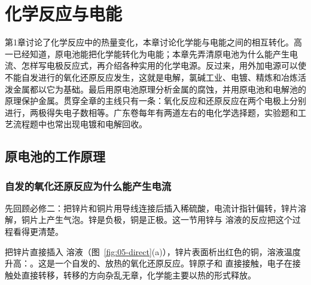\newcommand{\cfivebeaker}[4]{%
  \fill[mainblue!8] (#1,0) rectangle ++(#2,#4);
  \draw[thick] (#1,#3)--(#1,0)--++(#2,0)--++(0,#3);}
\newcommand{\cfivepower}[2]{%
  \draw[thick] (#1-0.12,#2-0.28)--(#1-0.12,#2+0.28); \draw[very thick] (#1+0.12,#2-0.15)--(#1+0.12,#2+0.15);
  \node[font=\scriptsize] at (#1-0.32,#2+0.3) {$+$}; \node[font=\scriptsize] at (#1+0.34,#2+0.3) {$-$};}

\chapter{化学反应与电能}

第1章讨论了化学反应中的热量变化，本章讨论化学能与电能之间的相互转化。高一已经知道，原电池能把化学能转化为电能；本章先弄清原电池为什么能产生电流、怎样写电极反应式，再介绍各种实用的化学电源。反过来，用外加电源可以使不能自发进行的氧化还原反应发生，这就是电解，氯碱工业、电镀、精炼和冶炼活泼金属都以它为基础。最后用原电池原理分析金属的腐蚀，并用原电池和电解池的原理保护金属。贯穿全章的主线只有一条：氧化反应和还原反应在两个电极上分别进行，两极得失电子数相等。广东卷每年有两道左右的电化学选择题，实验题和工艺流程题中也常出现电镀和电解回收。

\section{原电池的工作原理}

\subsection{自发的氧化还原反应为什么能产生电流}
先回顾必修二：把锌片和铜片用导线连接后插入稀硫酸，电流计指针偏转，锌片溶解，铜片上产生气泡。锌是负极，铜是正极。这一节用锌与  溶液的反应把这个过程看得更清楚。

把锌片直接插入  溶液（图~\ref{fig:05-direct}(a)），锌片表面析出红色的铜，溶液温度升高：。这是一个自发的、放热的氧化还原反应。锌原子和  直接接触，电子在接触处直接转移，转移的方向杂乱无章，化学能主要以热的形式释放。

